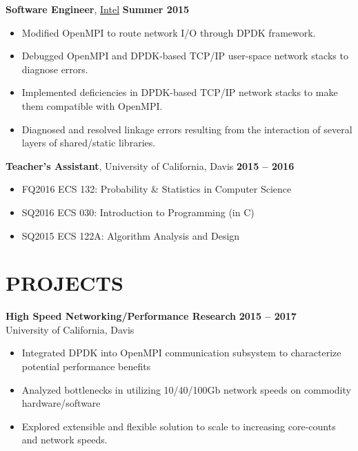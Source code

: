 \documentclass[letterpaper, 10pt, centered]{res} %
\begin{document}
\begin{resume}
\textbf{Software Engineer}, \href{https://www.intel.com}{Intel} \hfill \textbf{Summer 2015}
\begin{itemize}[noitemsep]
	\item Modified OpenMPI to route network I/O through DPDK framework.
	\item Debugged OpenMPI and DPDK-based TCP/IP user-space network stacks to diagnose errors.
	\item Implemented deficiencies in DPDK-based TCP/IP network stacks to make them compatible with OpenMPI.
	\item Diagnosed and resolved linkage errors resulting from the interaction of several layers of shared/static libraries.
\end{itemize}
\vspace{-6pt}

\textbf{Teacher's Assistant}, University of California, Davis \hfill \textbf{2015 -- 2016}
\begin{itemize}[noitemsep]
	\item[] \hspace{-12pt} FQ2016 ECS 132: Probability \& Statistics in Computer Science %
	\item[] \hspace{-12pt} SQ2016 ECS 030: Introduction to Programming (in C) %
	\item[] \hspace{-12pt} SQ2015 ECS 122A: Algorithm Analysis and Design %
\end{itemize}
\vspace{-6pt}

\section{PROJECTS}
\textbf{High Speed Networking/Performance Research} \hfill \textbf{2015 -- 2017} \\
{\small University of California, Davis}
\begin{itemize}[noitemsep]
	\item Integrated DPDK into OpenMPI communication subsystem to characterize potential performance benefits
	\item Analyzed bottlenecks in utilizing 10/40/100Gb network speeds on commodity hardware/software
	\item Explored extensible and flexible solution to scale to increasing core-counts and network speeds.
\end{itemize}
\vspace{-6pt}


\end{resume}
\end{document}
